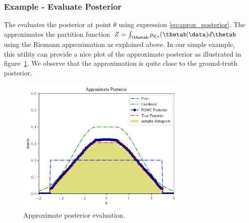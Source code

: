 \subsubsection*{Example - Evaluate Posterior}

The  evaluates the
posterior at point $\theta$ using expression
\eqref{eq:aprox_posterior}. The 
approximates the partition function
$Z = \int_{\thetab} p_{d,\epsilon}(\thetab|\data) d\thetab$ using the
Riemann approximation as explained above. In our simple example, this
utility can provide a nice plot of the approximate posterior as
illustrated in figure~\ref{fig:approx_posterior}. We observe that the
approximation is quite close to the ground-truth posterior.

\begin{figure}[ht]
    \begin{center}
      \includegraphics[width=0.75\textwidth]{./latex_files/images/chapter3/example_posterior.png}
    \end{center}
  \caption[Approximate posterior evaluation, at the 1D example.]{Approximate posterior evaluation.}
  \label{fig:approx_posterior}
\end{figure}
